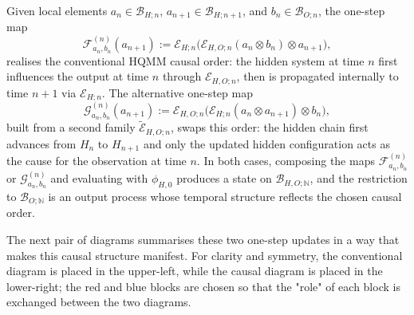 \documentclass[11pt, reco]{article}
\begin{document}
Given local elements \(a_n\in\mathcal{B}_{H;n}\), \(a_{n+1}\in\mathcal{B}_{H;n+1}\), and \(b_n\in\mathcal{B}_{O;n}\), the one-step map
\begin{equation}\label{eq_F}
\mathcal{F}_{a_n,b_n}^{(n)}(a_{n+1})
:=
\mathcal{E}_{H;n}\bigl(\mathcal{E}_{H,O;n}(a_n\otimes b_n)\otimes a_{n+1}\bigr),
\end{equation}
realises the conventional HQMM causal order: the hidden system at time \(n\) first influences the output at time \(n\) through \(\mathcal{E}_{H,O;n}\), then is propagated internally to time \(n+1\) via \(\mathcal{E}_{H;n}\). The alternative one-step map
\begin{equation}\label{eq_G}
\mathcal{G}_{a_n,b_n}^{(n)}(a_{n+1})
:=
{\mathcal{E}}_{H,O;n}\bigl(\mathcal{E}_{H;n}(a_n\otimes a_{n+1})\otimes b_n\bigr),
\end{equation}
 built from a second family \(\widetilde{\mathcal{E}}_{H,O;n}\), swaps this order: the hidden chain first advances from \(H_n\) to \(H_{n+1}\) and only the updated hidden configuration acts as the cause for the observation at time \(n\). In both cases, composing the maps \(\mathcal{F}_{a_n,b_n}^{(n)}\) or \(\mathcal{G}_{a_n,b_n}^{(n)}\) and evaluating with \(\phi_{H,0}\) produces a state on \(\mathcal{B}_{H,O;\mathbb{N}}\), and the restriction to \(\mathcal{B}_{O;\mathbb{N}}\) is an output process whose temporal structure reflects the chosen causal order.

 The next pair of diagrams summarises these two one-step updates in a way that makes this causal structure manifest. For clarity and symmetry, the conventional diagram is placed in the upper-left, while the causal diagram is placed in the lower-right; the red and blue blocks are chosen so that the "role" of each block is exchanged between the two diagrams.
\end{document}
